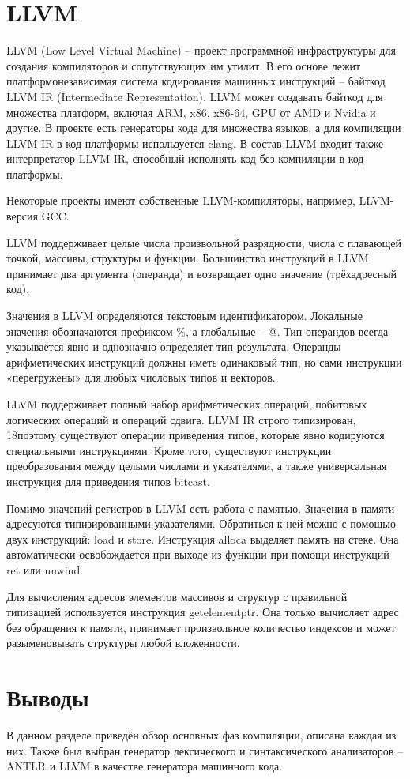 \section{LLVM}
LLVM (Low Level Virtual Machine) – проект программной инфраструктуры для создания компиляторов и сопутствующих им утилит. В его основе лежит платформонезависимая система кодирования машинных инструкций – байткод LLVM IR (Intermediate Representation). LLVM может создавать байткод для множества платформ, включая ARM, x86, x86-64, GPU от AMD и Nvidia и другие. В проекте есть генераторы кода для множества языков, а для компиляции LLVM IR в код платформы используется clang. В состав LLVM входит также интерпретатор LLVM IR, способный исполнять код без компиляции в код платформы. \cite{6}
 
Некоторые проекты имеют собственные LLVM-компиляторы, например, LLVM-версия GCC.

LLVM поддерживает целые числа произвольной разрядности, числа с плавающей точкой, массивы, структуры и функции. Большинство инструкций в LLVM принимает два аргумента (операнда) и возвращает одно значение (трёхадресный код).

Значения в LLVM определяются текстовым идентификатором. Локальные значения обозначаются префиксом \%, а глобальные – @. Тип операндов всегда указывается явно и однозначно определяет тип результата. Операнды арифметических инструкций должны иметь одинаковый тип, но сами инструкции «перегружены» для любых числовых типов и векторов.

LLVM поддерживает полный набор арифметических операций, побитовых логических операций и операций сдвига. LLVM IR строго типизирован, 18поэтому существуют операции приведения типов, которые явно кодируются специальными инструкциями. Кроме того, существуют инструкции преобразования между целыми числами и указателями, а также универсальная инструкция для приведения типов bitcast.

Помимо значений регистров в LLVM есть работа с памятью. Значения в памяти адресуются типизированными указателями. Обратиться к ней можно с помощью двух инструкций: load и store. Инструкция alloca выделяет память на стеке. Она автоматически освобождается при выходе из функции при помощи
инструкций ret или unwind.

Для вычисления адресов элементов массивов и структур с правильной типизацией используется инструкция getelementptr. Она только вычисляет адрес без обращения к памяти, принимает произвольное количество индексов и может разыменовывать структуры любой вложенности.

\section*{Выводы}
В данном разделе приведён обзор основных фаз компиляции, описана каждая из них. Также был выбран генератор лексического и синтаксического анализаторов – ANTLR и LLVM в качестве генератора машинного кода.